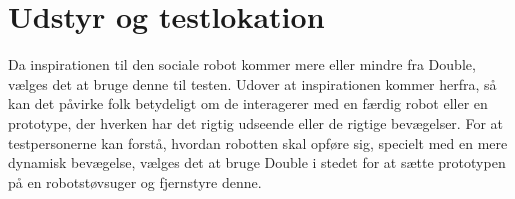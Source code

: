 \section{Udstyr og testlokation}
\label{TestAfSkalaUdstyrOgTestlokationValgAfGestikker}
%
Da inspirationen til den sociale robot kommer mere eller mindre fra Double, vælges det at bruge denne til testen. Udover at inspirationen kommer herfra, så kan det påvirke folk betydeligt om de interagerer med en færdig robot eller en prototype, der hverken har det rigtig udseende eller de rigtige bevægelser. For at testpersonerne kan forstå, hvordan robotten skal opføre sig, specielt med en mere dynamisk bevægelse, vælges det at bruge Double i stedet for at sætte prototypen på en robotstøvsuger og fjernstyre denne. 